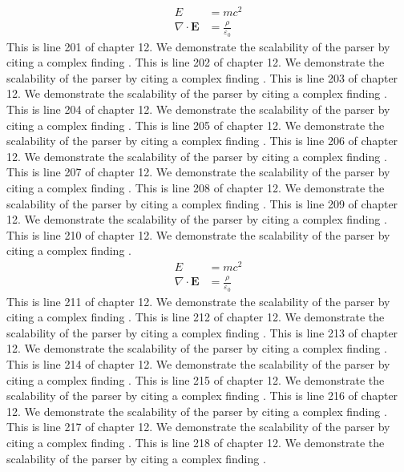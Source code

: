 \begin{align*}
  E &= mc^2 \\
  \nabla \cdot \mathbf{E} &= \frac{\rho}{\varepsilon_0}
\end{align*}
This is line 201 of chapter 12. We demonstrate the scalability of the parser by citing a complex finding \cite{ref12_201}.
This is line 202 of chapter 12. We demonstrate the scalability of the parser by citing a complex finding \cite{ref12_202}.
This is line 203 of chapter 12. We demonstrate the scalability of the parser by citing a complex finding \cite{ref12_203}.
This is line 204 of chapter 12. We demonstrate the scalability of the parser by citing a complex finding \cite{ref12_204}.
This is line 205 of chapter 12. We demonstrate the scalability of the parser by citing a complex finding \cite{ref12_205}.
This is line 206 of chapter 12. We demonstrate the scalability of the parser by citing a complex finding \cite{ref12_206}.
This is line 207 of chapter 12. We demonstrate the scalability of the parser by citing a complex finding \cite{ref12_207}.
This is line 208 of chapter 12. We demonstrate the scalability of the parser by citing a complex finding \cite{ref12_208}.
This is line 209 of chapter 12. We demonstrate the scalability of the parser by citing a complex finding \cite{ref12_209}.
This is line 210 of chapter 12. We demonstrate the scalability of the parser by citing a complex finding \cite{ref12_210}.
\begin{align*}
  E &= mc^2 \\
  \nabla \cdot \mathbf{E} &= \frac{\rho}{\varepsilon_0}
\end{align*}
This is line 211 of chapter 12. We demonstrate the scalability of the parser by citing a complex finding \cite{ref12_211}.
This is line 212 of chapter 12. We demonstrate the scalability of the parser by citing a complex finding \cite{ref12_212}.
This is line 213 of chapter 12. We demonstrate the scalability of the parser by citing a complex finding \cite{ref12_213}.
This is line 214 of chapter 12. We demonstrate the scalability of the parser by citing a complex finding \cite{ref12_214}.
This is line 215 of chapter 12. We demonstrate the scalability of the parser by citing a complex finding \cite{ref12_215}.
This is line 216 of chapter 12. We demonstrate the scalability of the parser by citing a complex finding \cite{ref12_216}.
This is line 217 of chapter 12. We demonstrate the scalability of the parser by citing a complex finding \cite{ref12_217}.
This is line 218 of chapter 12. We demonstrate the scalability of the parser by citing a complex finding \cite{ref12_218}.
